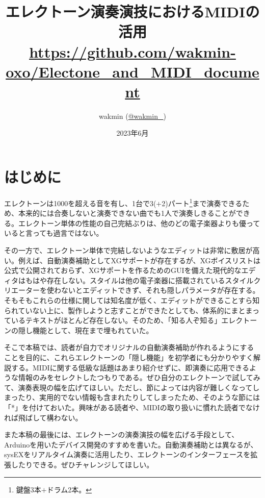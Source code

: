 \documentclass[uplatex, 10pt, dvipdfmx]{jsarticle}
\numberwithin{equation}{section}
\begin{document}
\VerbatimFootnotes
\columnseprule=0.2mm
\title{エレクトーン演奏演技におけるMIDIの活用 \\ \small\url{https://github.com/wakmin-oxo/Electone_and_MIDI_document}}
\author{wakmin (\href{https://twitter.com/wakmin_}{@wakmin\_})}
\date{2023年6月}
\maketitle


\setcounter{tocdepth}{4}
\tableofcontents
\clearpage

\section{はじめに}

エレクトーンは1000を超える音\cite{製品情報}を有し、1台で3($+$2)パート\footnote{鍵盤3本$+$ドラム2本。}まで演奏できるため、本来的には合奏しないと演奏できない曲でも1人で演奏しきることができる。エレクトーン単体の性能の自己完結ぶりは、他のどの電子楽器よりも優っていると言っても過言ではない。

その一方で、エレクトーン単体で完結しないようなエディットは非常に敷居が高い。例えば、自動演奏補助としてXGサポートが存在するが、XGボイスリストは公式で公開されておらず、XGサポートを作るためのGUIを備えた現代的なエディタはもはや存在しない。スタイルは他の電子楽器に搭載されているスタイルクリエーターを使わないとエディットできず、それも隠しパラメータが存在する。そもそもこれらの仕様に関しては知名度が低く、エディットができることすら知られていない上に、製作しようと志すことができたとしても、体系的にまとまっているテキストがほとんど存在しない。そのため、「知る人ぞ知る」エレクトーンの隠し機能として、現在まで埋もれていた。

そこで本稿では、読者が自力でオリジナルの自動演奏補助が作れるようにすることを目的に、これらエレクトーンの「隠し機能」を初学者にも分かりやすく解説する。MIDIに関する低級な話題はあまり紹介せずに、即演奏に応用できるような情報のみをセレクトしたつもりである。ぜひ自分のエレクトーンで試してみて、演奏表現の幅を広げてほしい。ただし、節によっては内容が難しくなってしまったり、実用的でない情報も含まれたりしてしまったため、そのような節には「*」を付けておいた。興味がある読者や、MIDIの取り扱いに慣れた読者でなければ飛ばして構わない。

また本稿の最後には、エレクトーンの演奏演技の幅を広げる手段として、Arduinoを用いたデバイス開発のすすめを書いた。自動演奏補助とは異なるが、sysEXをリアルタイム演奏に活用したり、エレクトーンのインターフェースを拡張したりできる。ぜひチャレンジしてほしい。
\end{document}

